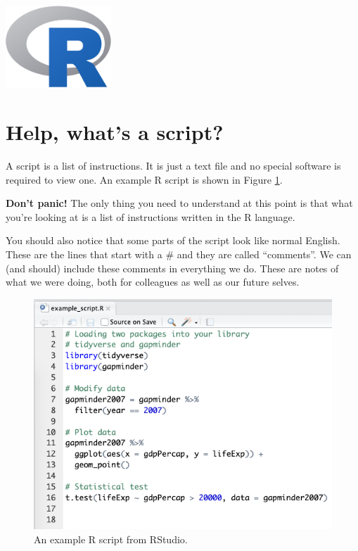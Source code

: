 \documentclass[
  12pt,
  krantz2]{krantz}
\begin{document}
\includegraphics[width=1.5625in,height=\textheight]{images/chapter01/Rlogo.png}

\hypertarget{chap01-what-script}{%
\section{Help, what's a script?}\label{chap01-what-script}}


A script is a list of instructions.
It is just a text file and no special software is required to view one.
An example R script is shown in Figure \ref{fig:chap01-fig-rscript}.

\textbf{Don't panic!}
The only thing you need to understand at this point is that what you're looking at is a list of instructions written in the R language.

You should also notice that some parts of the script look like normal English.
These are the lines that start with a \# and they are called ``comments''.
We can (and should) include these comments in everything we do.
These are notes of what we were doing, both for colleagues as well as our future selves.

\begin{figure}
\includegraphics[width=0.9\linewidth]{images/chapter01/example_script} \caption{An example R script from RStudio.}\label{fig:chap01-fig-rscript}
\end{figure}
\end{document}
